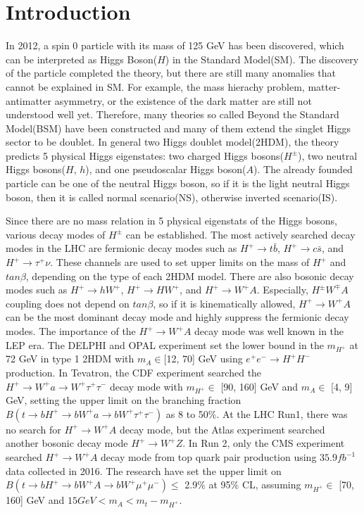 \documentclass[
12pt, %
a4paper, %
oneside, %
headinclude,footinclude, %
BCOR5mm, %
]{scrartcl}
\begin{document}
\section{Introduction}

In 2012, a spin 0 particle with its mass of 125 GeV has been discovered\cite{ATLASHiggsDiscovery}\cite{CMSHiggsDiscovery},
which can be interpreted as Higgs Boson($H$) in the Standard Model(SM)\cite{StandardModel}.
The discovery of the particle completed the theory, but there are still many anomalies
that cannot be explained in SM. For example, the mass hierachy problem, matter-antimatter
asymmetry, or the existence of the dark matter are still not understood well yet. Therefore, many
theories so called Beyond the Standard Model(BSM) have been constructed and many of them
extend the singlet Higgs sector to be doublet. In general two Higgs doublet model(2HDM)\cite{2HDM}, the
theory predicts 5 physical Higgs eigenstates: two charged Higgs bosons($H^{\pm}$),
two neutral Higgs bosons($H$, $h$), and one pseudoscalar Higgs boson($A$).
The already founded particle can be one of the neutral Higgs boson, so if it is the light neutral
Higgs boson, then it is called normal scenario(NS), otherwise inverted scenario(IS).

Since there are no mass relation in 5 physical eigenstats of the Higgs bosons, various decay modes
of $H^{\pm}$ can be established. The most actively searched decay modes 
in the LHC are fermionic decay modes such as
$H^+ \rightarrow t\bar{b}$\cite{HcTotb}, 
$H^+ \rightarrow c\bar{s}$\cite{HcTocs}, and 
$H^+ \rightarrow \tau^+\nu$\cite{HcTotaunu}.
These channels are used to set upper limits on the mass of $H^+$ and $tan\beta$, 
depending on the type of each 2HDM model.
There are also bosonic decay modes\cite{BosonicDecay} such as
$H^+ \rightarrow hW^+$,
$H^+ \rightarrow HW^+$, and
$H^+ \rightarrow W^+A$.
Especially, $H^{\pm}W^{\mp}A$ coupling does not depend on $tan\beta$,
so if it is kinematically allowed, $H^+ \rightarrow W^+A$ can be the most dominant
decay mode and highly suppress the fermionic decay modes\cite{HcToWASearch}.
The importance of the $H^+ \rightarrow W^+A$ decay mode was well known in the LEP era.
The DELPHI and OPAL experiment set the lower bound in the $m_{H^+}$ at 72 GeV
in type 1 2HDM with $m_A \in$[12, 70] GeV using $e^+e^- \rightarrow H^+H^-$ production\cite{DELPHISearch}\cite{OPALSearch}.
In Tevatron, the CDF experiment searched the
$H^+ \rightarrow W^+a \rightarrow W^+\tau^+\tau^-$
decay mode with $m_{H^+} \in$ [90, 160] GeV and $m_A \in$ [4, 9] GeV,
setting the upper limit on the branching fraction 
$B(t \rightarrow bH^+ \rightarrow bW^+a \rightarrow bW^+\tau^+\tau^-)$
as 8 to 50\%\cite{CDFSearch}. At the LHC Run1, there was no search for $H^+ \rightarrow W^+A$ decay mode,
but the Atlas experiment searched another bosonic decay mode $H^+ \rightarrow W^+Z$. In Run 2,
only the CMS  experiment searched $H^+ \rightarrow W^+A$ decay mode from top quark pair production 
using $35.9 fb^{-1}$ data collected in 2016. The research have set the upper limit on
$B(t \rightarrow bH^+ \rightarrow bW^+A \rightarrow bW^+\mu^+\mu^-) \le$ 2.9\% at 95\% CL,
assuming $m_{H^+} \in$ [70, 160] GeV and $15 GeV < m_A < m_t - m_{H^+}$\cite{PreviousSearch}.
\end{document}
